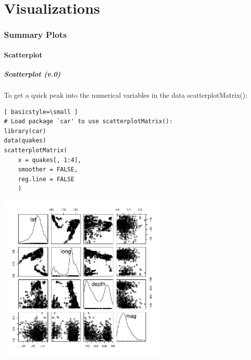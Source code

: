 \part{Visualizations}


\section[Summary Plots]{Summary Plots}

\subsection{Scatterplot}
\begin{frame}
\frametitle{Scatterplot (v.0)}

To get a quick peak into the numerical variables in the data \ttfamily scatterplotMatrix(): \normalfont
  		\begin{lstlisting}[ basicstyle=\small ]
# Load package `car' to use scatterplotMatrix():	
library(car)	
data(quakes)
scatterplotMatrix(
	x = quakes[, 1:4], 
	smoother = FALSE, 
	reg.line = FALSE
	)
		\end{lstlisting}

        \begin{center}
         \includegraphics[width=0.63\textwidth]{images/scatterPlot_v0.pdf}
        \end{center}
\end{frame}

